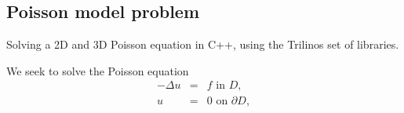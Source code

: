 \newtheorem{assumption}{Assumption}
\newtheorem{hypothesis}{Hypothesis}
\newtheorem{theorem}{Theorem}
\newtheorem{defi}{Definition}
\newtheorem{prop}{Proposition}
\newtheorem{lem}{Lemma}
\newtheorem{rem}{Remark}
\newcommand{\bx}{\mathbf{x}}
\newcommand{\by}{\mathbf{y}}
\newcommand{\bu}{\mathbf{u}}
\newcommand{\bg}{\mathbf{g}}
\newcommand{\be}{\mathbf{e}}
\newcommand{\bv}{\mathbf{v}}
\newcommand{\bz}{\mathbf{z}}
\newcommand{\buu}{\mathbf{U}}
\newcommand{\bV}{\mathbf{V}}
\newcommand{\bR}{\mathbf{R}}
\newcommand{\bff}{\mathbf{f}}
\newcommand{\bX}{\mathbf{X}}
\newcommand{\bA}{\mathbf{A}}
\newcommand{\bK}{\mathbf{K}}
\newcommand{\bI}{\mathbf{I}}
\newcommand{\bE}{\mathbf{E}}
\newcommand{\bB}{\mathbf{B}}
\newcommand{\bL}{\mathbf{L}}
\newcommand{\bb}{\mathbf{b}}
\newcommand{\bc}{\mathbf{c}}
\newcommand{\bM}{\mathbf{M}}
\newcommand{\br}{\mathbf{r}}
\newcommand{\btheta}{\boldsymbol{\theta}}
\newcommand{\bbeta}{\boldsymbol{\beta}}
\newcommand{\bzero}{\mathbf{0}}
\newcommand{\bvarphi}{\boldsymbol{\varphi}}
\newcommand{\bPhi}{\boldsymbol{\Phi}}
\newcommand{\balpha}{\boldsymbol{\alpha}}
\newcommand{\bxi}{\boldsymbol{\xi}}
\newcommand{\bgamma}{\boldsymbol{\gamma}}
\newcommand{\btau}{\boldsymbol{\tau}}
\newcommand{\bnabla}{\boldsymbol{\nabla}}
\newcommand{\uth}{u^{\btheta}}
\newcommand{\fth}{f^{\btheta}}
\newcommand{\gth}{g^{\btheta}}
\newcommand{\vth}{v^{\btheta}}
\newcommand{\wth}{w^{\btheta}}
\newcommand{\zth}{z^{\btheta}}
\newcommand{\ba}{\mathbf{a}}
\newcommand{\bw}{\mathbf{w}}
\newcommand{\etk}{\eta^k}
\newcommand{\xik}{\xi^k}
\newcommand{\bbth}{{\mathbf{b}}^{\theta_3}}
\newcommand{\xiav}{\langle \bxi \rangle}
\newcommand*{\Scale}[2][4]{\scalebox{#1}{$#2$}}%
\reversemarginpar

\subsection{Poisson model problem}

Solving a 2D and 3D Poisson equation in C++, using the Trilinos set of libraries.


We seek to solve the Poisson equation
\begin{eqnarray}
-\Delta u &=& f \mbox{ in } D,\label{eq:1}\\[1ex]
%
u &=& 0 \mbox{ on } \partial D,\label{eq:2}
\end{eqnarray}

